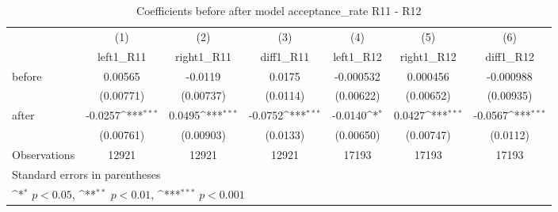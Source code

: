 \begin{table}[!ht]\centering \footnotesize
\def\sym#1{\ifmmode^{#1}\else\(^{#1}\)\fi}
\caption{Coefficients before after model acceptance\_rate R11 - R12}
\begin{tabular}{l*{6}{c}}
\hline\hline
                    &\multicolumn{1}{c}{(1)}&\multicolumn{1}{c}{(2)}&\multicolumn{1}{c}{(3)}&\multicolumn{1}{c}{(4)}&\multicolumn{1}{c}{(5)}&\multicolumn{1}{c}{(6)}\\
                    &\multicolumn{1}{c}{left1\_R11}&\multicolumn{1}{c}{right1\_R11}&\multicolumn{1}{c}{diff1\_R11}&\multicolumn{1}{c}{left1\_R12}&\multicolumn{1}{c}{right1\_R12}&\multicolumn{1}{c}{diff1\_R12}\\
\hline
before              &     0.00565         &     -0.0119         &      0.0175         &   -0.000532         &    0.000456         &   -0.000988         \\
                    &   (0.00771)         &   (0.00737)         &    (0.0114)         &   (0.00622)         &   (0.00652)         &   (0.00935)         \\
[1em]
after               &     -0.0257\sym{***}&      0.0495\sym{***}&     -0.0752\sym{***}&     -0.0140\sym{*}  &      0.0427\sym{***}&     -0.0567\sym{***}\\
                    &   (0.00761)         &   (0.00903)         &    (0.0133)         &   (0.00650)         &   (0.00747)         &    (0.0112)         \\
\hline
Observations        &       12921         &       12921         &       12921         &       17193         &       17193         &       17193         \\
\hline\hline
\multicolumn{7}{l}{\footnotesize Standard errors in parentheses}\\
\multicolumn{7}{l}{\footnotesize \sym{*} \(p<0.05\), \sym{**} \(p<0.01\), \sym{***} \(p<0.001\)}\\
\end{tabular}
\end{table}
